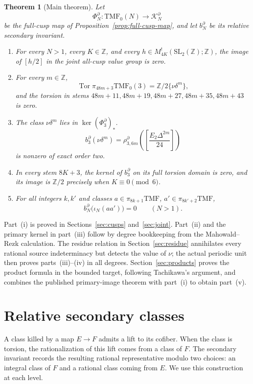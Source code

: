 \documentclass[11pt,a4paper]{amsart}
\newcommand{\Z}{\mathbb Z}
\newcommand{\TMF}{\mathrm{TMF}}
\newcommand{\Tor}{\operatorname{Tor}}
\newcommand{\cK}{\mathcal K}
\theoremstyle{plain}
\newtheorem{theorem}{Theorem}[section]
\theoremstyle{definition}
\theoremstyle{remark}
\begin{document}
\begin{theorem}[Main theorem]\label{thm:main}
Let
\[
 \Phi_N^\partial:\TMF_0(N)\longrightarrow\cK_N^\partial
\]
be the full-cusp map of Proposition~\ref{prop:full-cusp-map}, and let $b_N^\partial$ be its relative
secondary invariant.
\begin{enumerate}[label=\textup{(\roman*)},leftmargin=2.8em]
\item For every $N>1$, every $K\in\Z$, and every
$h\in M_{4K}^{!}(\mathrm{SL}_2(\Z);\Z)$, the image of $[h/2]$ in the joint all-cusp value group
is zero.
\item For every $m\in\Z$,
\[
 \Tor\pi_{48m+3}\TMF_0(3)=\Z/2\{\nu\delta^m\},
\]
and the torsion in stems $48m+11,48m+19,48m+27,48m+35,48m+43$ is zero.
\item The class $\nu\delta^m$ lies in $\ker(\Phi_3^\partial)_*$.
\[
 b_3^\partial(\nu\delta^m)
 =\rho_{3,6m}^\partial\!\left(\left[\frac{E_2\Delta^{2m}}{24}\right]\right)
\]
is nonzero of exact order two.
\item In every stem $8K+3$, the kernel of $b_3^\partial$ on its full torsion domain is
zero, and its image is $\Z/2$ precisely when $K\equiv0\pmod6$.
\item For all integers $k,k'$ and classes
$a\in\pi_{8k+1}\TMF$, $a'\in\pi_{8k'+2}\TMF$,
\[
 b_N^\partial\bigl(\iota_N(aa')\bigr)=0\qquad(N>1).
\]
\end{enumerate}
\end{theorem}

Part~\textup{(i)} is proved in Sections~\ref{sec:cusps}
and~\ref{sec:joint}. Part~\textup{(ii)} and the primary kernel in
part~\textup{(iii)} follow by degree bookkeeping from the
Mahowald--Rezk calculation. The residue relation in
Section~\ref{sec:residue} annihilates every rational source
indeterminacy but detects the value of $\nu$; the actual periodic
unit then proves parts~\textup{(iii)--(iv)} in all degrees.
Section~\ref{sec:products} proves the product formula in the bounded
target, following Tachikawa's argument, and combines the published
primary-image theorem with part~\textup{(i)} to obtain part~\textup{(v)}.

\section{Relative secondary classes}

A class killed by a map $E\to F$ admits a lift to its cofiber. When
the class is torsion, the rationalization of this lift comes from a
class of $F$. The secondary invariant records the resulting rational
representative modulo two choices: an integral class of $F$ and a
rational class coming from $E$. We use this construction at each level.
\end{document}

